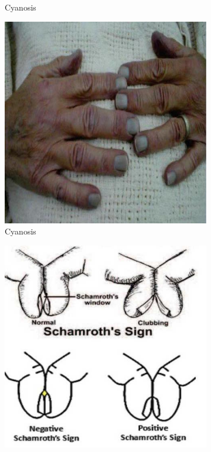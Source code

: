 \documentclass[a4paper,12pt,openany,oneside]{book}
\begin{document}
{\begin{figure}[h]
\begin{subfigure}[t]{.23\textwidth}
																	\caption{Cyanosis}
																	\label{Cyanosis3}
																\end{subfigure}
																\hspace{\fill}
																\begin{subfigure}[t]{.23\textwidth}
																	\centering
																	\includegraphics[width=\textwidth]{./clinicalPhysioPic/cyanosis4-3.jpg}
																	\caption{Cyanosis}
																	\label{Cyanosis4}
																\end{subfigure}
																\hspace{\fill}
																\begin{subfigure}[t]{.23\textwidth}
																	\centering
																	\includegraphics[width=\textwidth]{./clinicalPhysioPic/clubbing3-0.jpg}

\end{subfigure}
\end{figure}}
\end{document}

